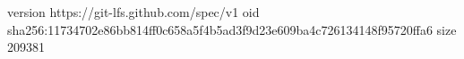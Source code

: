 version https://git-lfs.github.com/spec/v1
oid sha256:11734702e86bb814ff0c658a5f4b5ad3f9d23e609ba4c726134148f95720ffa6
size 209381

